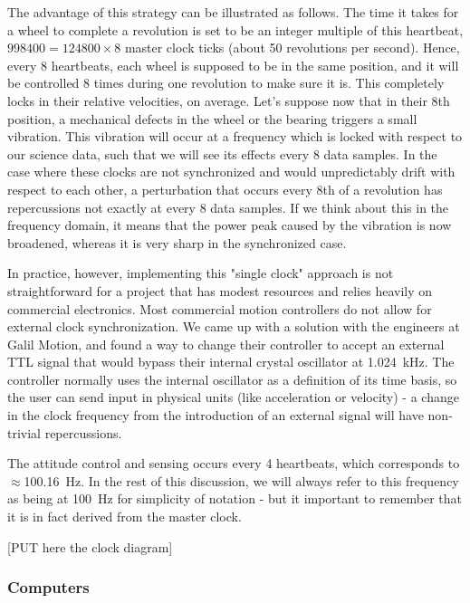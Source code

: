 The advantage of this strategy can be illustrated as follows. The time it takes for a wheel to complete a revolution is set to be an integer multiple of this heartbeat, $\num{998400}=\num{124800}\times 8$ master clock ticks (about 50 revolutions per second). Hence, every 8 heartbeats, each wheel is supposed to be in the same position, and it will be controlled 8 times during one revolution to make sure it is. This completely locks in their relative velocities, on average. Let's suppose now that in their 8th position, a mechanical defects in the wheel or the bearing triggers a small vibration. This vibration will occur at a frequency which is locked with respect to our science data, such that we will see its effects every 8 data samples. In the case where these clocks are not synchronized and would unpredictably drift with respect to each other, a perturbation that occurs every 8th of a revolution has repercussions not exactly at every 8 data samples. If we think about this in the frequency domain, it means that the power peak caused by the vibration is now broadened, whereas it is very sharp in the synchronized case.

In practice, however, implementing this "single clock" approach is not straightforward for a project that has modest resources and relies heavily on commercial electronics. Most commercial motion controllers do not allow for external clock synchronization. We came up with a solution with the engineers at Galil Motion, and found a way to change their controller to accept an external TTL signal that would bypass their internal crystal oscillator at \SI{1.024}{\kilo\hertz}. The controller normally uses the internal oscillator as a definition of its time basis, so the user can send input in physical units (like acceleration or velocity) - a change in the clock frequency from the introduction of an external signal will have non-trivial repercussions.

The attitude control and sensing occurs every 4 heartbeats, which corresponds to $\approx$\SI{100.16}{\hertz}. In the rest of this discussion, we will always refer to this frequency as being at \SI{100}{\hertz} for simplicity of notation - but it important to remember that it is in fact derived from the master clock.

[PUT here the clock diagram]

\subsubsection{Computers}

